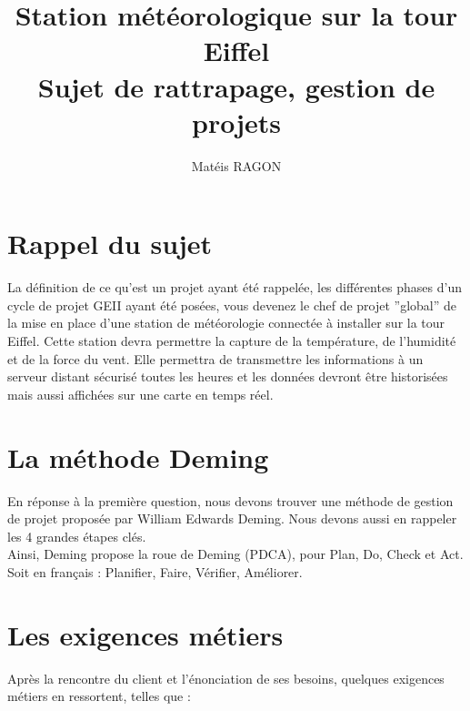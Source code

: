 \documentclass[titlepage]{article}
\title{Station météorologique sur la tour Eiffel \\ [1ex] \large Sujet de rattrapage, gestion de projets}
\author{Matéis RAGON}
\begin{document}
	\begin{titlepage}
		\maketitle
	\end{titlepage}

	\tableofcontents

	\clearpage

	\section{Rappel du sujet}

	La définition de ce qu’est un projet ayant été rappelée, les différentes phases d’un cycle de projet GEII ayant été posées, vous devenez le chef de projet ”global” de la mise en place d’une station de météorologie connectée à installer sur la tour Eiffel. Cette station devra permettre la capture de la température, de l’humidité et de la force du vent. Elle permettra de transmettre les informations à un serveur distant sécurisé toutes les heures et les données devront être historisées mais aussi affichées sur une carte en temps réel.

	\section{La méthode Deming}

	En réponse à la première question, nous devons trouver une méthode de gestion de projet proposée par William Edwards Deming. Nous devons aussi en rappeler les 4 grandes étapes clés. \\

	Ainsi, Deming propose la roue de Deming (PDCA), pour Plan, Do, Check et Act. Soit en français : Planifier, Faire, Vérifier, Améliorer.

	\section{Les exigences métiers}

	Après la rencontre du client et l’énonciation de ses besoins, quelques exigences métiers en ressortent, telles que :
\end{document}
